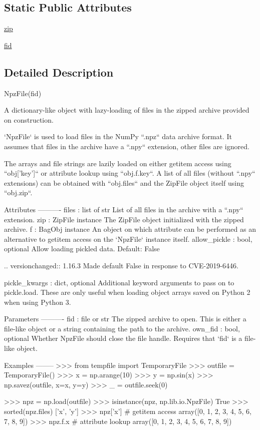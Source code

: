 \subsection*{Static Public Attributes}
\begin{DoxyCompactItemize}
\item 
\hyperlink{classnumpy_1_1lib_1_1npyio_1_1NpzFile_afff3d523933ebb7eddb3c9d64d35e4d2}{zip}
\item 
\hyperlink{classnumpy_1_1lib_1_1npyio_1_1NpzFile_a5111469fe872459c2713ed08a41730b8}{fid}
\end{DoxyCompactItemize}


\subsection{Detailed Description}
\begin{DoxyVerb}NpzFile(fid)

A dictionary-like object with lazy-loading of files in the zipped
archive provided on construction.

`NpzFile` is used to load files in the NumPy ``.npz`` data archive
format. It assumes that files in the archive have a ``.npy`` extension,
other files are ignored.

The arrays and file strings are lazily loaded on either
getitem access using ``obj['key']`` or attribute lookup using
``obj.f.key``. A list of all files (without ``.npy`` extensions) can
be obtained with ``obj.files`` and the ZipFile object itself using
``obj.zip``.

Attributes
----------
files : list of str
    List of all files in the archive with a ``.npy`` extension.
zip : ZipFile instance
    The ZipFile object initialized with the zipped archive.
f : BagObj instance
    An object on which attribute can be performed as an alternative
    to getitem access on the `NpzFile` instance itself.
allow_pickle : bool, optional
    Allow loading pickled data. Default: False

    .. versionchanged:: 1.16.3
        Made default False in response to CVE-2019-6446.

pickle_kwargs : dict, optional
    Additional keyword arguments to pass on to pickle.load.
    These are only useful when loading object arrays saved on
    Python 2 when using Python 3.

Parameters
----------
fid : file or str
    The zipped archive to open. This is either a file-like object
    or a string containing the path to the archive.
own_fid : bool, optional
    Whether NpzFile should close the file handle.
    Requires that `fid` is a file-like object.

Examples
--------
>>> from tempfile import TemporaryFile
>>> outfile = TemporaryFile()
>>> x = np.arange(10)
>>> y = np.sin(x)
>>> np.savez(outfile, x=x, y=y)
>>> _ = outfile.seek(0)

>>> npz = np.load(outfile)
>>> isinstance(npz, np.lib.io.NpzFile)
True
>>> sorted(npz.files)
['x', 'y']
>>> npz['x']  # getitem access
array([0, 1, 2, 3, 4, 5, 6, 7, 8, 9])
>>> npz.f.x  # attribute lookup
array([0, 1, 2, 3, 4, 5, 6, 7, 8, 9])\end{DoxyVerb}
 

